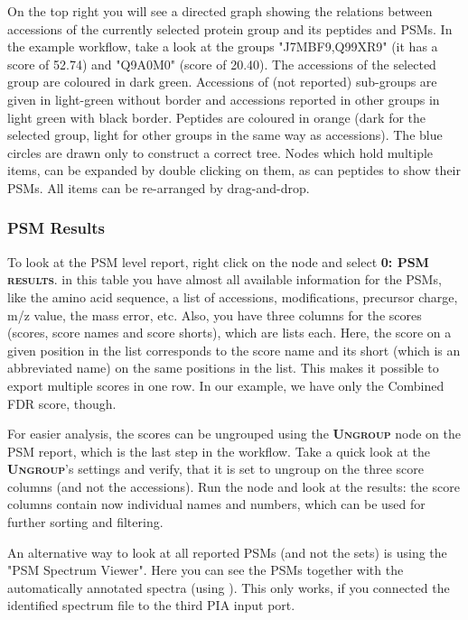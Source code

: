 \documentclass[a4paper,11pt,twoside]{article}
\newcommand{\menu}[1]{{\scshape\bfseries #1}}
\newcommand{\knimenode}[1]{{\scshape\bfseries #1}}
\begin{document}
On the top right you will see a directed graph showing the relations between
accessions of the currently selected protein group and its peptides and PSMs.
In the example workflow, take a look at the groups "J7MBF9,Q99XR9" (it has
a score of 52.74) and "Q9A0M0" (score of 20.40). The accessions of the selected
group are coloured in dark green. Accessions of (not reported) sub-groups are
given in light-green without border and accessions reported in other groups in
light green with black border. Peptides are coloured in orange (dark for the
selected group, light for other groups in the same way as accessions). The blue
circles are drawn only to construct a correct tree. Nodes which hold multiple
items, can be expanded by double clicking on them, as can peptides to show their
PSMs. All items can be re-arranged by drag-and-drop.


\subsubsection{PSM Results}

To look at the PSM level report, right click on the node and select \menu{0:
PSM results}. in this table you have almost all available information for the
PSMs, like the amino acid sequence, a list of accessions, modifications,
precursor charge, m/z value, the mass error, etc. Also, you have three columns
for the scores (scores, score names and score shorts), which are lists each.
Here, the score on a given position in the list corresponds to the score name
and its short (which is an abbreviated name) on the same positions in the list.
This makes it possible to export multiple scores in one row. In our example, we
have only the Combined FDR score, though.

For easier analysis, the scores can be ungrouped using the \knimenode{Ungroup}
node on the PSM report, which is the last step in the workflow. Take a quick
look at the \knimenode{Ungroup}'s settings and verify, that it is set to
ungroup on the three score columns (and not the accessions). Run the node and
look at the results: the score columns contain now individual names and
numbers, which can be used for further sorting and filtering.

An alternative way to look at all reported PSMs (and not the sets) is using the
"PSM Spectrum Viewer". Here you can see the PSMs together with the
automatically annotated spectra (using \cite{perez2015}). This only works, if
you connected the identified spectrum file to the third PIA input port.
\end{document}
